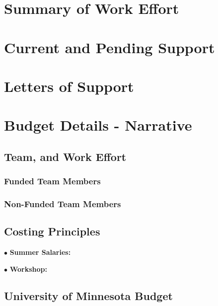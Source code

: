 \documentclass[12pt]{article}
\begin{document}
\newpage
\addtocounter{page}{8}
\section{Summary of Work Effort}
\label{sec:workeffort}



\section{Current and Pending Support}
\label{sec:current_and_pending}

\newpage
\addtocounter{page}{13}
\section{Letters of Support}
\label{sec:lettersofsupport}

\newpage
\addtocounter{page}{3}
\section{Budget Details - Narrative}
\label{sec:budget}

\subsection{Team, and Work Effort}
\label{sec:budget_principles}


\subsubsection{Funded Team Members}


\subsubsection{Non-Funded Team Members}


\subsection{Costing Principles}
\label{sec:cost_principles}


$\bullet$ \hspace{0.2in} {\bf Summer Salaries:} 


$\bullet$ \hspace{0.2in} {\bf Workshop:} 


        \subsection{University of Minnesota Budget}
\end{document}
